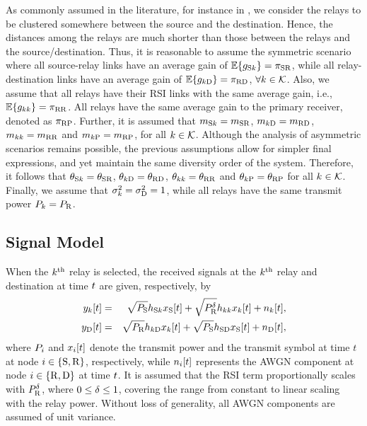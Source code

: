 \documentclass[10pt,journal]{IEEEtran}
\begin{document}
As commonly assumed in the literature, for instance in \cite{201102_TWC_Lee_DF}, we consider the relays to be clustered somewhere between the source and the destination. Hence, the distances among the relays are much shorter than those between the relays and the source/destination.
Thus, it is reasonable to assume the symmetric scenario where all source-relay links have an average gain of $\mathbb{E}\{g_{{\rm S} k}\}={\pi_{{\rm S} {\rm R}}}$, while all relay-destination links have an average gain of $\mathbb{E}\{g_{k {\rm D}}\}={\pi_{{\rm R} {\rm D}}}$, $\forall k \in {\mathcal{K}}$. Also, we assume that all relays have their \ac{RSI} links with the same average gain, i.e., $\mathbb{E}\{g_{kk}\}={\pi_{{\rm R} {\rm R}}}$. All relays have the same average gain to the primary receiver, denoted as ${\pi_{{\rm R} {\rm P}}}$. Further, it is assumed that ${m_{{\rm S} k}}={m_{{\rm S} {\rm R}}}$, ${m_{k {\rm D}}}={m_{{\rm R} {\rm D}}}$, ${m_{kk}}={m_{{\rm R} {\rm R}}}$ and ${m_{k {\rm P}}}={m_{{\rm R} {\rm P}}}$, for all $k\in{\mathcal{K}}$. Although the analysis of asymmetric scenarios remains possible, the previous assumptions allow for simpler final expressions, and yet maintain the same diversity order of the system. Therefore, it follows that ${\theta_{{\rm S} k}}={\theta_{{\rm S} {\rm R}}}$, ${\theta_{k {\rm D}}}={\theta_{{\rm R} {\rm D}}}$, ${\theta_{kk}}={\theta_{{\rm R} {\rm R}}}$ and ${\theta_{k {\rm P}}}={\theta_{{\rm R} {\rm P}}}$ for all $k\in{\mathcal{K}}$. Finally, we assume that $\sigma_{k}^2=\sigma_{{\rm D}}^2=1$, while all relays have the same transmit power $P_{k}=P_{{\rm R}}$.

\subsection{Signal Model}
When the $k^{\rm th}$ relay is selected, the received signals at the $k^{\rm th}$ relay and destination at time $t$ are given, respectively, by
\begin{eqnarray}
y_{k}[t]	
&=& \sqrt{P_{{\rm S}}} h_{{\rm S} k} x_{{\rm S}}[t] + \sqrt{P_{{\rm R}}^\delta} h_{kk} x_{k}[t] + n_k[t], \label{eq:R_RX_FDRS_inst}\\
y_{{\rm D}}[t]	
&=& \sqrt{P_{{\rm R}}} h_{k {\rm D}} x_{k}[t] + \sqrt{P_{{\rm S}}} h_{{\rm S} {\rm D}} x_{{\rm S}}[t] +n_{{\rm D}}[t], \label{eq:D_RX_FDRS_inst}
\end{eqnarray}
where $P_{i}$ and $x_i[t]$ denote the transmit power and the transmit symbol at time $t$ at node $i \in \{{\rm S}, {\rm R}\}$, respectively, while $n_i[t]$ represents the \ac{AWGN} component at node $i \in \{{\rm R}, {\rm D}\}$ at time $t$. It is assumed that the \ac{RSI} term proportionally scales with $P_{{\rm R}}^\delta$, where $0 \leq \delta \leq 1$, covering the range from constant to linear scaling with the relay power. Without loss of generality, all \ac{AWGN} components are assumed of unit variance.
\end{document}
